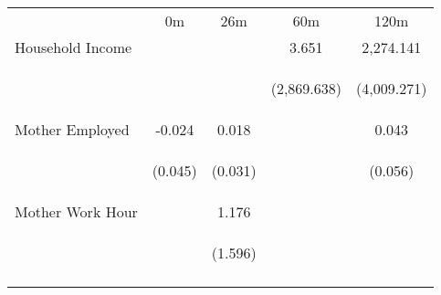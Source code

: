 \begin{tabular}{lcccc}
\hline \noalign{\smallskip} & 0m & 26m & 60m & 120m\\
\noalign{\smallskip}\hline \noalign{\smallskip}Household Income &  &  & 3.651 & 2,274.141\\
 & \begin{footnotesize}\end{footnotesize} & \begin{footnotesize}\end{footnotesize} & \begin{footnotesize}(2,869.638)\end{footnotesize} & \begin{footnotesize}(4,009.271)\end{footnotesize}\\
\noalign{\smallskip}Mother Employed & -0.024 & 0.018 &  & 0.043\\
 & \begin{footnotesize}(0.045)\end{footnotesize} & \begin{footnotesize}(0.031)\end{footnotesize} & \begin{footnotesize}\end{footnotesize} & \begin{footnotesize}(0.056)\end{footnotesize}\\
\noalign{\smallskip}Mother Work Hour &  & 1.176 &  & \\
 & \begin{footnotesize}\end{footnotesize} & \begin{footnotesize}(1.596)\end{footnotesize} & \begin{footnotesize}\end{footnotesize} & \begin{footnotesize}\end{footnotesize}\\
\noalign{\smallskip}\hline\end{tabular}\\
